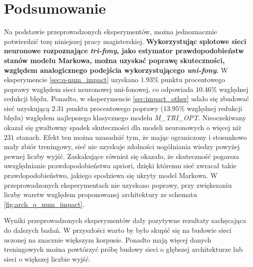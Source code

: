 \documentclass[shortabstract, mgr]{iithesis}
\begin{document}
\section{ Podsumowanie }
	Na podstawie przeprowadzonych eksperymentów, można jednoznacznie potwierdzić tezę niniejszej pracy magisterskiej. \textbf{Wykorzystując splotowe sieci neuronowe rozpoznające \textit{tri-fony}, jako estymator prawdopodobieństw stanów modelu Markowa, można uzyskać poprawę skuteczności, względem analogicznego podejścia wykorzystującego \textit{uni-fony}.} W eksperymencie \ref{sec:q-num_impact} uzyskano $1.93\%$ punktu procentowego poprawy względem sieci neuronowej uni-fonowej, co odpowiada $10.46\%$ względnej redukcji błędu. Ponadto, w eksperymencie \ref{sec:impact_other} udało się zbudować sieć uzyskującą $2.31$ punktu procentowego poprawy ($13.95\%$ względnej redukcji błędu) względem najlepszego klasycznego modelu \textit{M\_TRI\_OPT}. Nieoczekiwany okazał się gwałtowny spadek skuteczności dla modeli neuronowych o więcej niż $231$ stanach. Efekt ten można uzasadnić tym, że mając ograniczony i stosunkowo mały zbiór treningowy, sieć nie uzyskuje zdolności uogólniania wiedzy powyżej pewnej liczby wyjść. Zaskakujące również się okazało, że skuteczność pogarsza uwzględnianie prawdopodobieństwa apriori, dzięki któremu sieć zwracał takie prawdopodobieństwo, jakiego spodziewa się ukryty model Markowa. W przeprowadzonych eksperymentach nie uzyskano poprawy, przy zwiększaniu liczby warstw względem proponowanej architektury ze schematu \ref{fig:arch_q_num_impact}.
	
	Wyniki przeprowadzonych eksperymentów dały pozytywne rezultaty zachęcająca do dalszych badań. W przyszłości warto by było skupić się na budowie sieci uczonej na znacznie większym korpusie. Ponadto mają więcej danych treningowych można powtórzyć próbę budowy sieci o głębszej architekturze lub sieci o większej liczbie wyjść.
   
   
	
	
\end{document}
